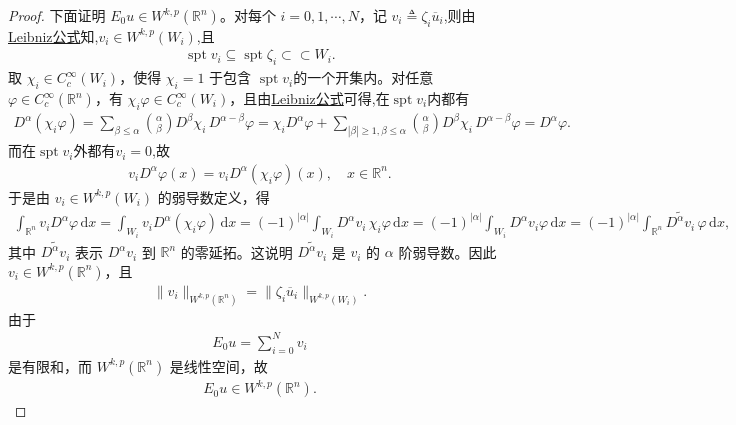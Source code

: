 \documentclass[../../main.tex]{subfiles}
\begin{document}
\begin{proof}
下面证明 $E_0u\in W^{k,p}(\mathbb{R}^n)$。对每个 $i=0,1,\cdots,N$，记
$v_i\triangleq\zeta_i\overline{u}_i$,则由\hyperref[theorem:ch05-弱导数性质]{Leibniz公式}知,$v_i\in W^{k,p}(W_i)$,且
\begin{align*}
\operatorname{spt}v_i\subseteq\operatorname{spt}\zeta_i\subset\subset W_i.
\end{align*}
取 $\chi_i\in C_c^\infty(W_i)$，使得 $\chi_i=1$ 于包含 $\operatorname{spt}v_i$的一个开集内。对任意 $\varphi\in C_c^\infty(\mathbb{R}^n)$，有 $\chi_i\varphi\in C_c^\infty(W_i)$，且由\hyperref[theorem:ch05-弱导数性质]{Leibniz公式}可得,在$\operatorname{spt}v_i$内都有
\begin{align*}
D^{\alpha}(\chi _i\varphi )=\sum_{\beta \leqslant \alpha}{\binom{\alpha}{\beta}D^{\beta}\chi _i\,D^{\alpha -\beta}\varphi}=\chi _iD^{\alpha}\varphi +\sum_{|\beta |\geqslant 1,\beta \leqslant \alpha}{\binom{\alpha}{\beta}D^{\beta}\chi _i\,D^{\alpha -\beta}\varphi}=D^{\alpha}\varphi .
\end{align*}
而在$\operatorname{spt}v_i$外都有$v_i=0$,故
\begin{align*}
v_iD^\alpha\varphi(x)=v_iD^\alpha(\chi_i\varphi)(x),\quad x\in \mathbb{R}^n.
\end{align*}
于是由 $v_i\in W^{k,p}(W_i)$ 的弱导数定义，得
\begin{align*}
\int_{\mathbb{R}^n}v_iD^\alpha\varphi\,\mathrm{d}x
=\int_{W_i}v_iD^\alpha(\chi_i\varphi)\,\mathrm{d}x=(-1)^{|\alpha|}\int_{W_i}D^\alpha v_i\,\chi_i\varphi\,\mathrm{d}x=(-1)^{|\alpha|}\int_{W_i}D^\alpha v_i\varphi\,\mathrm{d}x=(-1)^{|\alpha|}\int_{\mathbb{R}^n}\widetilde{D^\alpha v_i}\,\varphi\,\mathrm{d}x,
\end{align*}
其中 $\widetilde{D^\alpha v_i}$ 表示 $D^\alpha v_i$ 到 $\mathbb{R}^n$ 的零延拓。这说明 $\widetilde{D^\alpha v_i}$ 是 $v_i$ 的 $\alpha$ 阶弱导数。因此 $v_i\in W^{k,p}(\mathbb{R}^n)$，且
\begin{align*}
\|v_i\|_{W^{k,p}(\mathbb{R}^n)}=\|\zeta_i\overline{u}_i\|_{W^{k,p}(W_i)}.
\end{align*}
由于
\begin{align*}
E_0u=\sum\limits_{i=0}^{N}v_i
\end{align*}
是有限和，而 $W^{k,p}(\mathbb{R}^n)$ 是线性空间，故
\begin{align*}
E_0u\in W^{k,p}(\mathbb{R}^n).
\end{align*}


\end{proof}
\end{document}
